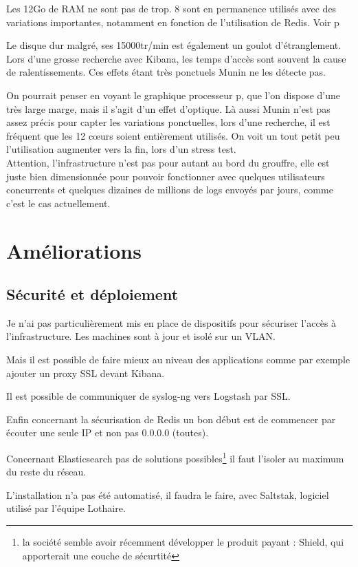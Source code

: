 Les 12Go de RAM ne sont pas de trop. 8 sont en permanence utilisés avec des variations
importantes, notamment en fonction de l'utilisation de Redis. Voir p\pageref{fig:elk1memory}

Le disque dur malgré, ses 15000tr/min est également un goulot d'étranglement. Lors
d'une grosse recherche avec Kibana, les temps d'accès sont souvent la cause de ralentissements.
Ces effets étant très ponctuels Munin ne les détecte pas.

On pourrait penser en voyant le graphique processeur p\pageref{fig:elk1cpu}, que 
l'on dispose d'une très large marge, mais il s'agit d'un effet d'optique. 
Là aussi Munin n'est pas assez précis pour capter les variations ponctuelles, 
lors d'une recherche, il est fréquent que les 12 cœurs soient entièrement utilisés.
On voit un tout petit peu l'utilisation augmenter vers la fin, lors d'un stress test.\\[3mm]

Attention, l'infrastructure n'est pas pour autant au bord du grouffre, elle est juste
bien dimensionnée pour pouvoir fonctionner avec quelques utilisateurs concurrents et
quelques dizaines de millions de \gls{logs} envoyés par jours, comme c'est le cas actuellement.


\section{Améliorations}
\subsection{Sécurité et déploiement}
Je n'ai pas particulièrement mis en place de dispositifs pour sécuriser 
l'accès à l'infrastructure. Les machines sont à jour et isolé sur un VLAN. 

Mais il est possible de faire mieux au niveau des applications comme par exemple 
ajouter un proxy SSL devant Kibana.

Il est possible de communiquer de syslog-ng vers Logstash par SSL.

Enfin concernant la sécurisation de Redis un bon début est de commencer par écouter 
une seule IP et non pas  0.0.0.0 (toutes).

Concernant Elasticsearch pas de solutions possibles\footnote{la société semble avoir récemment développer
le produit payant : Shield, qui apporterait une couche de sécurtité} il faut l'isoler au maximum du 
reste du réseau.

L'installation n'a pas été automatisé, il faudra le faire, avec Saltstak, logiciel
utilisé par l'équipe Lothaire.
